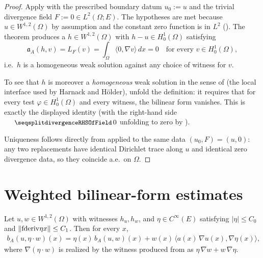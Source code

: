 \begin{proof}
\leanok
{}

Apply  with the
prescribed boundary datum $u_0 := u$ and the trivial divergence field
$F := 0 \in L^{2}(\Omega; E)$. The hypotheses are met because $u \in
W^{1,2}(\Omega)$ by assumption and the constant zero function is in $L^2$
(). The theorem produces a
$h \in W^{1,2}(\Omega)$ with $h - u \in H^{1}_{0}(\Omega)$ satisfying
\begin{equation*}
  \mathfrak{a}_A(h, v) = L_F(v) = \int_{\Omega}\langle 0, \nabla v\rangle\,dx = 0
  \quad \text{for every } v \in H^{1}_{0}(\Omega),
\end{equation*}
i.e.\ $h$ is a homogeneous weak solution against any choice of witness for $v$.

To see that $h$ is moreover a \emph{homogeneous} weak solution in the sense of
 (the local interface used by Harnack and
H\"older), unfold the definition: it requires that for every test
$\varphi \in H^{1}_{0}(\Omega)$ and every witness, the bilinear form vanishes.
This is exactly the displayed identity (with the right-hand side
$\leanname{divergenceRHSOfField}\,0$ unfolding to zero by
).

Uniqueness follows directly from
 applied to the same
data $(u_0, F) = (u, 0)$: any two replacements have identical Dirichlet trace
along $u$ and identical zero divergence data, so they coincide a.e.\ on
$\Omega$.
\end{proof}

\section{Weighted bilinear-form estimates}

\begin{lemma}
\label{lem:bilinFormIntegrand_mul_smooth_eq}
\leanok
{}
Let $u, w \in W^{1,2}(\Omega)$ with witnesses $h_u, h_w$, and $\eta \in C^{\infty}(E)$ satisfying $|\eta| \leq C_0$ and $\|\mathrm{fderiv}{\eta}{x}\| \leq C_1$. Then for every $x$,
\begin{multline*}
  b_A(u, \eta\!\cdot\!w)(x) = \eta(x)\,b_A(u,w)(x) + w(x)\,\bigl\langle a(x)\,\nabla u(x), \nabla \eta(x)\bigr\rangle,
\end{multline*}
where $\nabla(\eta\cdot w)$ is realized by the witness produced from  as $\eta\,\nabla w + w\,\nabla \eta$.
\end{lemma}

